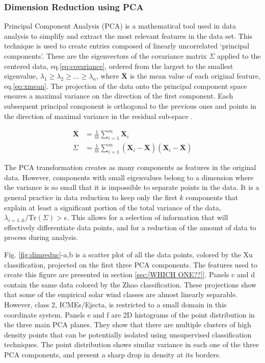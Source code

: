 \subsubsection{Dimension Reduction using PCA}
Principal Component Analysis (PCA) is a mathematical tool used in data analysis to simplify and extract the most relevant features in the data set. This technique is used to create entries composed of linearly uncorrelated `principal components'. These are the eigenvectors of the covariance matrix $\Sigma$ applied to the centered data, eq.\eqref{eq:covariance}, ordered from the largest to the smallest eigenvalue, $\lambda_1 \ge \lambda_2 \ge ... \ge \lambda_n$, where $\overline{\boldsymbol{X}}$ is the mean value of each original feature, eq.\eqref{eq:xmean}. The projection of the data onto the principal component space ensures a maximal variance on the direction of the first component. Each subsequent principal component is orthogonal to the previous ones and points in the direction of maximal variance in the residual sub-space \citep{Shlens2014}.

\begin{align}
\overline{\boldsymbol{X}} & = \frac{1}{m} \sum_{i=1}^{m} \boldsymbol{X}_i \label{eq:xmean} \\
\Sigma & = \frac{1}{m} \sum_{i=1}^{m} \left( \boldsymbol{X}_i - \overline{\boldsymbol{X}} \right)\left( \boldsymbol{X}_i - \overline{\boldsymbol{X}} \right) \label{eq:covariance}
\end{align}

The PCA transformation creates as many components as features in the original data. However, components with small eigenvalues belong to a dimension where the variance is so small that it is impossible to separate points in the data. It is a general practice in data reduction to keep only the first $k$ components that explain at least a significant portion of the total variance of the data, $\lambda_{i=1..k}/\text{Tr}(\Sigma) > \epsilon$. This allows for a selection of information that will effectively differentiate data points, and for a reduction of the amount of data to process during analysis.

Fig. \ref{fig:dimreduc}-a,b is a scatter plot of all the data points, colored by the Xu classification, projected on the first three PCA components. The features used to create this figure are presented in section \ref{sec:[WHICH ONE??]}. Panels c and d contain the same data colored by the Zhao classification. These projections show that some of the empirical solar wind classes are almost linearly separable. However, class 2, ICMEs/Ejecta, is restricted to a small domain in this coordinate system. Panels e and f are 2D histograms of the point distribution in the three main PCA planes. They show that there are multiple clusters of high density points that can be potentially isolated using unsupervised classification techniques. The point distribution shows similar variance in each one of the three PCA components, and present a sharp drop in density at its borders.

